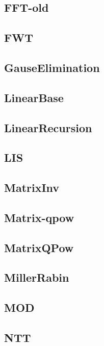 \documentclass{article}
\begin{document}
\subsection{FFT-old}

\subsection{FWT}

\subsection{GauseElimination}

\subsection{LinearBase}

\subsection{LinearRecursion}

\subsection{LIS}

\subsection{MatrixInv}

\subsection{Matrix-qpow}

\subsection{MatrixQPow}

\subsection{MillerRabin}

\subsection{MOD}

\subsection{NTT}

\end{document}

